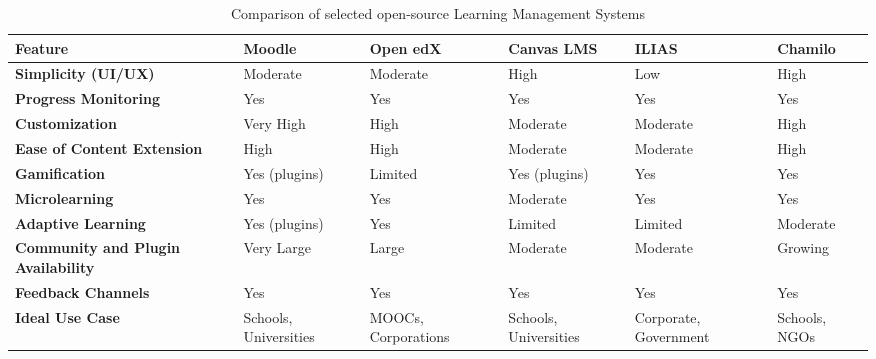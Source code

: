 \begin{table}[ht]
\centering
\small
\begin{tabular}{|>{\raggedright\arraybackslash}p{2.5cm}|
                >{\raggedright\arraybackslash}p{1.9cm}|
                >{\raggedright\arraybackslash}p{1.9cm}|
                >{\raggedright\arraybackslash}p{1.9cm}|
                >{\raggedright\arraybackslash}p{1.9cm}|
                >{\raggedright\arraybackslash}p{1.7cm}|}
\hline
\textbf{Feature} & \textbf{Moodle} & \textbf{Open edX} & \textbf{Canvas LMS} & \textbf{ILIAS} & \textbf{Chamilo} \\
\hline
\textbf{Simplicity (UI/UX)} & Moderate & Moderate & High & Low & High \\
\hline
\textbf{Progress Monitoring} & Yes & Yes & Yes & Yes & Yes \\
\hline
\textbf{Customization} & Very High & High & Moderate & Moderate & High \\
\hline
\textbf{Ease of Content Extension} & High & High & Moderate & Moderate & High \\
\hline
\textbf{Gamification} & Yes (plugins) & Limited & Yes (plugins) & Yes & Yes \\
\hline
\textbf{Microlearning} & Yes & Yes & Moderate & Yes & Yes \\
\hline
\textbf{Adaptive Learning} & Yes (plugins) & Yes & Limited & Limited & Moderate \\
\hline
\textbf{Community and Plugin Availability} & Very Large & Large & Moderate & Moderate & Growing \\
\hline
\textbf{Feedback Channels} & Yes & Yes & Yes & Yes & Yes \\
\hline
\textbf{Ideal Use Case} & Schools, Universities & MOOCs, Corporations & Schools, Universities & Corporate, Government & Schools, NGOs \\
\hline
\end{tabular}
\caption{Comparison of selected open-source Learning Management Systems}
\label{tab:lms_comparison}
\end{table}

